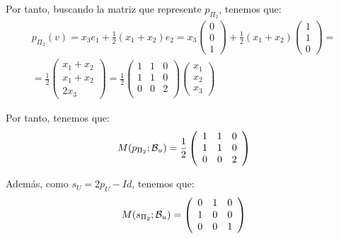 \begin{ejercicio}
\begin{enumerate}
\begin{enumerate}
        Por tanto, buscando la matriz que represente $p_{\Pi_2}$, tenemos que:
        \begin{multline*}
            p_{\Pi_2}(v)=x_3e_1 +\frac{1}{2}(x_1 + x_2)e_2
            =x_3\left(\begin{array}{c}
                 0 \\ 0 \\ 1
            \end{array}\right) +\frac{1}{2}(x_1+x_2) \left(\begin{array}{c}
                 1 \\ 1 \\ 0
            \end{array}\right)
            =\\=
            \frac{1}{2}\left(\begin{array}{c}
                 x_1 + x_2 \\ x_1 + x_2 \\ 2x_3
            \end{array}\right)
            =\frac{1}{2}\left(\begin{array}{ccc}
                 1 & 1 & 0 \\
                 1 & 1 & 0 \\
                 0 & 0 & 2 \\
            \end{array}\right)\left(\begin{array}{c}
                 x_1 \\ x_2 \\ x_3
            \end{array}\right)
        \end{multline*}
        
        Por tanto, tenemos que:
        \begin{equation*}
            M(p_{\Pi_2};\mathcal{B}_u)=\frac{1}{2}\left(\begin{array}{ccc}
                 1 & 1 & 0 \\
                 1 & 1 & 0 \\
                 0 & 0 & 2 \\
            \end{array}\right)
        \end{equation*}

        Además, como $s_U = 2p_U - Id$, tenemos que:
        \begin{equation*}
            M(s_{\Pi_2};\mathcal{B}_u)=\left(\begin{array}{ccc}
                 0 & 1 & 0 \\
                 1 & 0 & 0 \\
                 0 & 0 & 1 \\
            \end{array}\right)
        \end{equation*}





\end{enumerate}
\end{enumerate}
\end{ejercicio}

